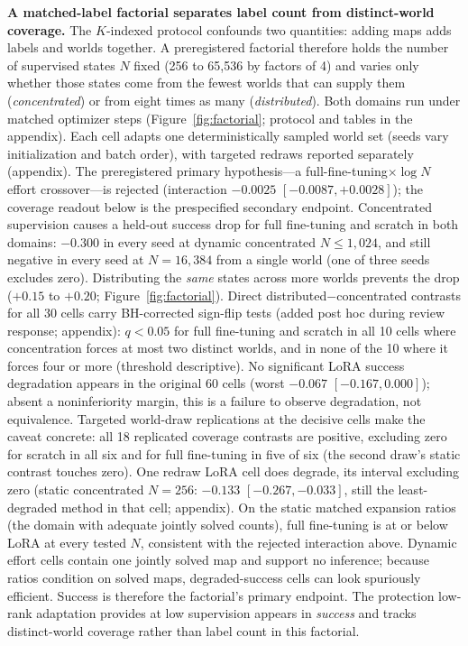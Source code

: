 \documentclass[letterpaper]{article} %
\begin{document}
\textbf{A matched-label factorial separates label count from distinct-world coverage.} The $K$-indexed protocol confounds two quantities: adding maps adds labels and worlds together. A preregistered factorial therefore holds the number of supervised states $N$ fixed (256 to 65{,}536 by factors of 4) and varies only whether those states come from the fewest worlds that can supply them (\emph{concentrated}) or from eight times as many (\emph{distributed}). Both domains run under matched optimizer steps (Figure~\ref{fig:factorial}; protocol and tables in the appendix). Each cell adapts one deterministically sampled world set (seeds vary initialization and batch order), with targeted redraws reported separately (appendix). The preregistered primary hypothesis---a full-fine-tuning$\times\log N$ effort crossover---is rejected (interaction $-0.0025$ $[-0.0087, +0.0028]$); the coverage readout below is the prespecified secondary endpoint. Concentrated supervision causes a held-out success drop for full fine-tuning and scratch in both domains: $-0.300$ in every seed at dynamic concentrated $N \leq 1{,}024$, and still negative in every seed at $N{=}16{,}384$ from a single world (one of three seeds excludes zero). Distributing the \emph{same} states across more worlds prevents the drop ($+0.15$ to $+0.20$; Figure~\ref{fig:factorial}). Direct distributed$-$concentrated contrasts for all 30 cells carry BH-corrected sign-flip tests (added post hoc during review response; appendix): $q{<}0.05$ for full fine-tuning and scratch in all 10 cells where concentration forces at most two distinct worlds, and in none of the 10 where it forces four or more (threshold descriptive). No significant LoRA success degradation appears in the original 60 cells (worst $-0.067$ $[-0.167, 0.000]$); absent a noninferiority margin, this is a failure to observe degradation, not equivalence. Targeted world-draw replications at the decisive cells make the caveat concrete: all 18 replicated coverage contrasts are positive, excluding zero for scratch in all six and for full fine-tuning in five of six (the second draw's static contrast touches zero). One redraw LoRA cell does degrade, its interval excluding zero (static concentrated $N{=}256$: $-0.133$ $[-0.267, -0.033]$, still the least-degraded method in that cell; appendix). On the static matched expansion ratios (the domain with adequate jointly solved counts), full fine-tuning is at or below LoRA at every tested $N$, consistent with the rejected interaction above. Dynamic effort cells contain one jointly solved map and support no inference; because ratios condition on solved maps, degraded-success cells can look spuriously efficient. Success is therefore the factorial's primary endpoint. The protection low-rank adaptation provides at low supervision appears in \emph{success} and tracks distinct-world coverage rather than label count in this factorial.
\end{document}
